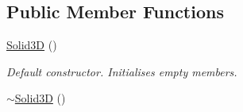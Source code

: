\subsection*{Public Member Functions}
\begin{DoxyCompactItemize}
\item 
\hypertarget{class_solid3_d_a8c69dd01b422d74c8ff298e7f9ba95d5}{\hyperlink{class_solid3_d_a8c69dd01b422d74c8ff298e7f9ba95d5}{Solid3\-D} ()}\label{class_solid3_d_a8c69dd01b422d74c8ff298e7f9ba95d5}

\begin{DoxyCompactList}\small\item\em Default constructor. Initialises empty members. \end{DoxyCompactList}\item 
\hypertarget{class_solid3_d_afa6ecd2e276b4ef5a09f3c660a6ccfed}{\hyperlink{class_solid3_d_afa6ecd2e276b4ef5a09f3c660a6ccfed}{$\sim$\-Solid3\-D} ()}\label{class_solid3_d_afa6ecd2e276b4ef5a09f3c660a6ccfed}


\end{DoxyCompactItemize}
